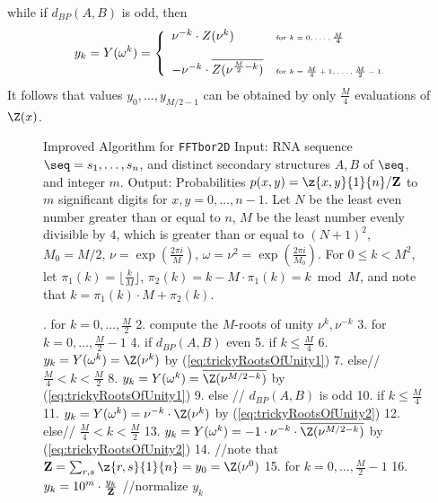 while if $d_{BP}(A,B)$ is odd, then
\begin{eqnarray}
\label{eq:trickyRootsOfUnity2}
y_k = Y(\omega^k) = \left\{
\begin{array}{ll}
\nu^{-k} \cdot Z(\nu^k) &\mbox{\tiny for $k=0,\ldots,\frac{M}{4}$}\\
\quad & \quad\\
-\nu^{-k} \cdot \overline{Z(\nu^{\frac{M}{2}-k})} &\mbox{\tiny for $k=\frac{M}{4}+1,\ldots,\frac{M}{2}-1$.}\\
\end{array} \right.
\end{eqnarray}
It follows that values $y_0,\ldots,y_{M/2-1}$ can be obtained by only
$\frac{M}{4}$ evaluations of $\Z(x)$.


\begin{figure}[!h]
\begin{small}
{\sc Improved Algorithm} for {\tt FFTbor2D}\hfill\break
{\sc Input:} RNA sequence $\seq=s_1,\ldots,s_n$, and distinct secondary
structures $A,B$ of $\seq$, and integer $m$. \hfill\break
{\sc Output:} Probabilities $p(x,y)=\z{x,y}{1}{n}/{\bf Z}$
to $m$ significant digits for $x,y=0,\ldots,n-1$.
Let $N$ be the least even number greater than or equal
to $n$, $M$ be the least number evenly divisible by $4$, which is greater than
or equal to $(N+1)^2$, $M_0=M/2$, $\nu = \exp(\frac{2\pi i}{M})$,
$\omega=\nu^2= \exp(\frac{2\pi i}{M_0})$. For $0 \leq k < M^2$, let
$\pi_1(k) = \lfloor \frac{k}{M} \rfloor$,
$\pi_2(k) = k - M \cdot \pi_1(k) = k \bmod M$, and note that
$k=\pi_1(k)\cdot M + \pi_2(k)$.
\end{small}
\hfill\break
\smallskip
\begin{small}
.  for $k=0,\ldots,\frac{M}{2}$
2.    compute the $M$-roots of unity $\nu^k,\nu^{-k}$
3.  for $k=0,\ldots,\frac{M}{2}-1$
4.    if $d_{BP}(A,B)$ even
5.      if $k \leq \frac{M}{4}$
6.        $y_k = Y(\omega^k)=\Z(\nu^k)$ by (\ref{eq:trickyRootsOfUnity1})
7.      else// $\frac{M}{4}<k<\frac{M}{2}$
8.        $y_k = Y(\omega^k)=\overline{\Z(\nu^{M/2-k})}$ by (\ref{eq:trickyRootsOfUnity1})
9.    else // $d_{BP}(A,B)$ is odd
10.     if $k \leq \frac{M}{4}$
11.       $y_k = Y(\omega^k)=\nu^{-k} \cdot \Z(\nu^k)$ by (\ref{eq:trickyRootsOfUnity2})
12.     else// $\frac{M}{4}<k<\frac{M}{2}$
13.       $y_k = Y(\omega^k)= -1 \cdot \nu^{-k} \cdot \overline{\Z(\nu^{M/2-k})}$ by (\ref{eq:trickyRootsOfUnity2})
14. //note that ${\bf Z}=\sum_{r,s}\z{r,s}{1}{n}=y_0=\Z(\nu^0)$
15. for $k=0,\ldots,\frac{M}{2}-1$
16.   $y_k = 10^m \cdot \frac{y_k}{{\bf Z}}$ //normalize $y_k$



\end{small}
\end{figure}
